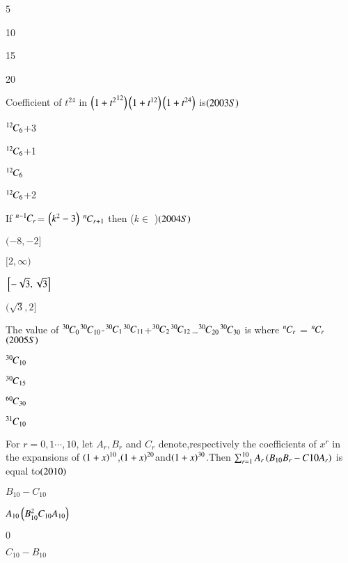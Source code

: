 \documentclass[journal,12pt,onecolumn]{IEEEtran}
\theoremstyle{remark}
\begin{document}
\begin{enumerate}
{\begin{enumerate}
\begin{multicols}{2}
    \item5 
    \item10
    \item15
    \item 20
    \end{multicols}
\end{enumerate}
\item Coefficient of $t^{24}$ in $\left({1+t^2}^{12}\right)\left(1+t^{12}\right)\left(1+t^{24}\right)$ is{\hfill$\left(2003S\right)$}
\begin{enumerate}
\begin{multicols}{2}
\item ${{}^{12}\mkern-1muC_{6}}$+3
\item ${{}^{12}\mkern-1muC_{6}}$+1 
\item ${{}^{12}\mkern-1muC_{6}}$
\item ${{}^{12}\mkern-1muC_{6}}$+2\end{multicols}
\end{enumerate}

\item If ${{}^{n-1}\mkern-1muC_{r}}$= $\left(k^2-3\right)$ ${{}^{n}\mkern-1muC_{r+1}}$ then ($k \in $ )\hfill{$\left(2004S\right)$}

\begin{enumerate}
\begin{multicols}{2}
    \item $(-8,-2]$
    \item $[2,\infty)$
    \item${}\left[-\sqrt{3},\sqrt{3}\right]$
    \item$(\sqrt{3},2]$
    \end{multicols}
\end{enumerate}

\item The value of
	${{}^{30}\mkern-1muC_{0}}$${{}^{30}\mkern-1muC_{10}}$-${{}^{30}\mkern-1muC_{1}}$${{}^{30}\mkern-1muC_{11}}$+${{}^{30}\mkern-1muC_{2}}$${{}^{30}\mkern-1muC_{12}}$\dots${{}^{30}\mkern-1muC_{20}}$${{}^{30}\mkern-1muC_{30}}$ is where ${{}^{n}\mkern-1muC_{r}}$ = ${{}^{n}\mkern-1muC_{r}}${\hfill$\left(2005S\right)$}
\begin{enumerate}
\begin{multicols}{2}
\item${{}^{30}\mkern-1muC_{10}}$ 
\item${{}^{30}\mkern-1muC_{15}}$
\item${{}^{60}\mkern-1muC_{30}}$ 
\item${{}^{31}\mkern-1muC_{10}}$
\end{multicols}
\end{enumerate}
\item For $r=0,1\cdots,10$, let $A_r,B_r$ and $C_r$ denote,respectively the coefficients of $x^r$ in the expansions of $\left(1+x\right)^{10}$,$\left(1+x\right)^{20}$and$\left(1+x\right)^{30}$.Then $\sum_{r=1}^{10}A_r\left(B_{10}B_r-C{10}A_r\right)$ is equal to{\hfill$\left(2010\right)$}
\begin{enumerate}
 \begin{multicols}{2}
 \item $B_{10}-C_{10}$ 
 \item $A_{10}\left(B_{10}^2C_{10}A_{10}\right)$ 
 \item $0$
 \item $C_{10}-B_{10}$
 \end{multicols}
\end{enumerate}

}
\end{enumerate}
\end{document}
